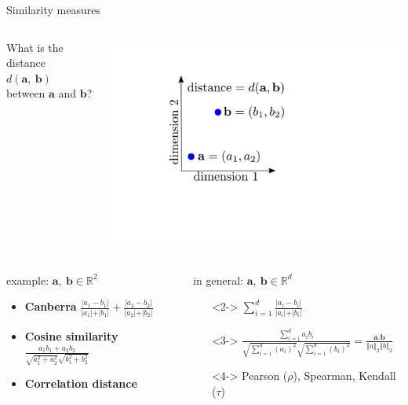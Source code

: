 \documentclass[pdf]{beamer}
\begin{document}
\begin{frame}{Similarity measures}
\vspace{-1cm}
\begin{columns}
What is the distance $d(\mathbf{a,\ b})$ between $\mathbf{a}$ and $\mathbf{b}$?
\begin{center}
	\includegraphics[width=\textwidth]{distance.pdf}
\end{center}
\end{columns}
\begin{columns}
\begin{block}{example: $\mathbf{a,\ b}\in \mathbb{R}^2$}
\begin{itemize}\addtolength{\itemsep}{1.46\baselineskip}
	\item<2-> \textbf{Canberra} 
	$\frac{\vert a_1 - b_1 \vert}{\vert a_1 \vert + \vert b_1 \vert} + \frac{\vert a_2 - b_2 \vert}{\vert a_2 \vert + \vert b_2 \vert} $
	\item<3-> \textbf{Cosine similarity} 
	$\frac{a_1b_1 + a_2b_2}{\sqrt{a_1^2 + a_2^2}\sqrt{b_1^2 + b_2^2}}$
	\item<4-> \textbf{Correlation distance}
\end{itemize}
\end{block}
\begin{block}{in general: $\mathbf{a,\ b}\in \mathbb{R}^d$}
\begin{itemize}\addtolength{\itemsep}{1.85\baselineskip}
	\item[]<2->
	$\sum_{i=1}^{d}\frac{\vert a_i - b_i \vert}{\vert a_i \vert + \vert b_i \vert}$
	\item[]<3->
	$\frac{\sum_{i=1}^{d}a_ib_i}{\sqrt{\sum_{i=1}^{d}(a_i)^2}\sqrt{\sum_{i=1}^{d}(b_i)^2}} = \frac{\mathbf{a.b}}{\Vert a \Vert_2 \Vert b \Vert_2}$
	\item[]<4->
	Pearson ($\rho$), Spearman, Kendall ($\tau$)
\end{itemize}
\end{block}
\end{columns}
\end{frame}
\end{document}
